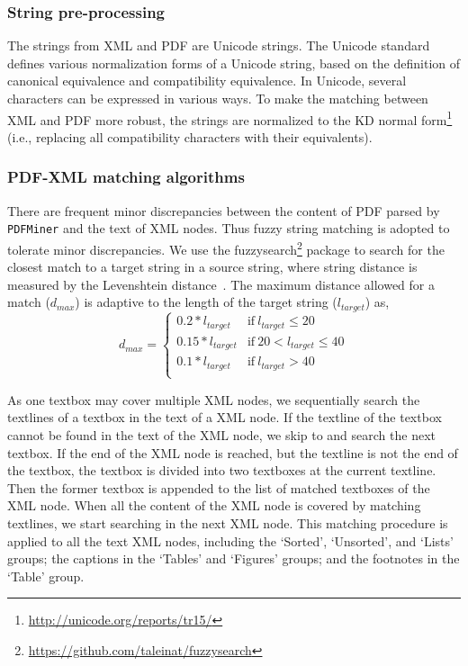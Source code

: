 \documentclass[conference]{IEEEtran}
\begin{document}
\subsubsection{String pre-processing}

The strings from XML and PDF are Unicode strings. The Unicode standard defines various normalization forms of a Unicode string, based on the definition of canonical equivalence and compatibility equivalence. In Unicode, several characters can be expressed in various ways. To make the matching between XML and PDF more robust, the strings are normalized to the KD normal form\footnote{\url{http://unicode.org/reports/tr15/}} (i.e., replacing all compatibility characters with their equivalents).

\subsubsection{PDF-XML matching algorithms}

There are frequent minor discrepancies between the content of PDF parsed by \texttt{PDFMiner} and the text of XML nodes. Thus fuzzy string matching is adopted to tolerate minor discrepancies. We use the fuzzysearch\footnote{\url{https://github.com/taleinat/fuzzysearch}} package to search for the closest match to a target string in a source string, where string distance is measured by the Levenshtein distance~\cite{levenshtein1966binary}. The maximum distance allowed for a match ($d_{max}$) is adaptive to the length of the target string ($l_{target}$) as,
\begin{equation*}
  d_{max} = \left\{
            \begin{array}{ll}
            0.2 * l_{target} & \text{if}\ l_{target} \le 20 \\
            0.15 * l_{target} & \text{if}\ 20 < l_{target} \le 40 \\
            0.1 * l_{target} & \text{if}\ l_{target} > 40 \\
            \end{array}
            \right.
\end{equation*}

As one textbox may cover multiple XML nodes, we sequentially search the textlines of a textbox in the text of a XML node. If the textline of the textbox cannot be found in the text of the XML node, we skip to and search the next textbox. If the end of the XML node is reached, but the textline is not the end of the textbox, the textbox is divided into two textboxes at the current textline. Then the former textbox is appended to the list of matched textboxes of the XML node. When all the content of the XML node is covered by matching textlines, we start searching in the next XML node. This matching procedure is applied to all the text XML nodes, including the `Sorted', `Unsorted', and `Lists' groups; the captions in the `Tables' and `Figures' groups; and the footnotes in the `Table' group.
\end{document}
